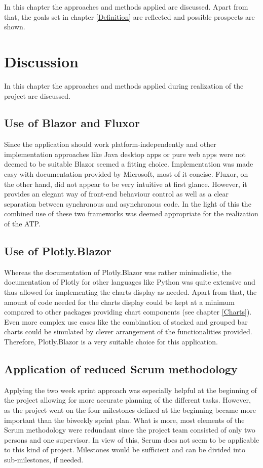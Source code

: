 
In this chapter the approaches and methods applied are discussed. Apart from that, the goals set in chapter \ref{Definition} are reflected and possible prospects are shown.

\section{Discussion}
In this chapter the approaches and methods applied during realization of the project are discussed.

\subsection{Use of Blazor and Fluxor}
Since the application should work platform-independently and other implementation approaches like Java desktop apps or pure web apps were not deemed to be suitable Blazor seemed a fitting choice. Implementation was made easy with documentation provided by Microsoft, most of it concise. Fluxor, on the other hand, did not appear to be very intuitive at first glance. However, it provides an elegant way of front-end behaviour control as well as a clear separation between synchronous and asynchronous code. In the light of this the combined use of these two frameworks was deemed appropriate for the realization of the ATP.

\subsection{Use of Plotly.Blazor}
Whereas the documentation of Plotly.Blazor was rather minimalistic, the documentation of Plotly for other languages like Python was quite extensive and thus allowed for implementing the charts display as needed. Apart from that, the amount of code needed for the charts display could be kept at a minimum compared to other packages providing chart components (see chapter \ref{Charts}). Even more complex use cases like the combination of stacked and grouped bar charts could be simulated by clever arrangement of the functionalities provided. Therefore, Plotly.Blazor is a very suitable choice for this application.

\subsection{Application of reduced Scrum methodology}
Applying the two week sprint approach was especially helpful at the beginning of the project allowing for more accurate planning of the different tasks. However, as the project went on the four milestones defined at the beginning became more important than the biweekly sprint plan. What is more, most elements of the Scrum methodology were redundant since the project team consisted of only two persons and one supervisor. In view of this, Scrum does not seem to be applicable to this kind of project. Milestones would be sufficient and can be divided into sub-milestones, if needed.

